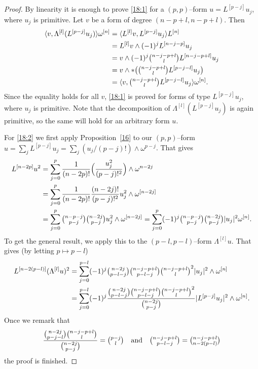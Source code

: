 \documentclass[11pt,a4paper]{amsart}
\def\^#1{^{[#1]}}
\def\la{\langle}
\def\ra{\rangle}
\theoremstyle{definition}
\numberwithin{equation}{section}
\begin{document}
\begin{proof}
  By linearity it is enough to prove \eqref{18:1} for a $(p,p)$--form
$u = L\^{p-j} u_j$, where $u_j$ is primitive. Let $v$ be a form
of degree $(n-p+l,n-p+l)$. Then
  \begin{align*}
    \la v, \Lambda\^ l (L\^{p-j} u_j ) \ra \omega\^ n
    &= \la L\^ l v, L\^{p-j} u_j \ra L\^ n \\
    &= L\^ l v \wedge (-1)^j L\^{n-j-p} u_j  \\
    &= v \wedge (-1)^j \tbinom{n-j-p+l}{l} L\^{n-j-p+l} u_j  \\
    &= v \wedge * \bigl( \tbinom{n-j-p+l}{l} L\^{p-j-l} u_j \bigr) \\
    &= \la v, \tbinom{n-j-p+l}{l} L\^{p-j-l} u_j \ra \omega\^ n.
  \end{align*}
Since the equality holds for all $v$, \eqref{18:1} is proved for forms
of type $L\^{p-j} u_j$, where $u_j$ is primitive. Note that the
decomposition of $\Lambda\^ l (L\^{p-j} u_j)$ is again primitive, so
the same will hold for an arbitrary form $u$.

For \eqref{18:2} we first 
apply Proposition~\ref{16} to our $(p,p)$--form
$u = \sum_j L\^{p-j} u_j = \sum_j (u_j/(p-j)!) \wedge \omega^{p-j}$.
That gives
\begin{align*}
L\^{n-2p} u^2 
&= \sum_{j=0}^p \frac{1}{(n-2p)!}\Bigl( \frac{u_j^2}{(p-j)!^2} \Bigr) 
\wedge \omega^{n-2j}\\
&= \sum_{j=0}^p \frac{1}{(n-2p)!}\frac{(n-2j)!}{(p-j)!^2} 
u_j^2 \wedge \omega\^{n-2j}\\
&= \sum_{j=0}^p \tbinom{n-p-j}{p-j} \tbinom{n-2j}{p-j}
u_j^2 \wedge \omega\^{n-2j}
= \sum_{j=0}^p (-1)^j \tbinom{n-p-j}{p-j} \tbinom{n-2j}{p-j}
\lvert u_j \rvert^2 \omega\^{n}.
\end{align*}
To get the general result, we apply this to the $(p-l,p-l)$--form $\Lambda\^ l
u$. That gives (by letting $p \mapsto p - l$)
\begin{align*}
  L\^{n-2(p-l)} (\Lambda\^ l u)^2   
  &= \sum_{j=0}^{p-l} 
  (-1)^j
  \tbinom{n-2j}{p-l-j}
  \tbinom{n-j-p+l}{p-l-j}
  \tbinom{n-j-p+l}{l}^2
  \lvert u_j \rvert^2
  \wedge \omega\^ n
  \\
  &= \sum_{j=0}^{p-l} 
  (-1)^j
  \frac{
  \tbinom{n-2j}{p-l-j}
  \tbinom{n-j-p+l}{p-l-j}
  \tbinom{n-j-p+l}{l}^2
  }{\tbinom{n-2j}{p-j}}
  \lvert L\^{p-j} u_j \rvert^2
  \wedge \omega\^ n.
\end{align*}
Once we remark that
$$
\frac{\binom{n-2j}{p-j-l} \binom{n-j-p+l}{l}}{\binom{n-2j}{p-j}}
= \tbinom{p-j}{l}
\quad\hbox{and}\quad
\tbinom{n-j-p+l}{p-l-j} = \tbinom{n-j-p+l}{n-2(p-l)}
$$
the proof is finished.
\end{proof}
\end{document}

